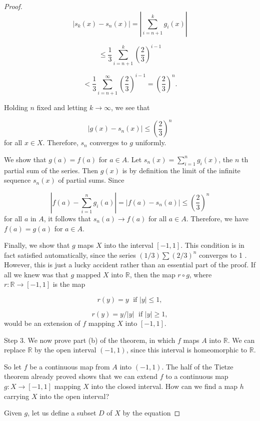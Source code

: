 \begin{proof}
\[
| {s_{k}(x) - s_{n}(x) }| = | {\mathop{\sum }\limits_{{i = n + 1}}^{k}g_{i}(x) }|
\]

\[
\leq \frac{1}{3}\mathop{\sum }\limits_{{i = n + 1}}^{k}{( \frac{2}{3}) }^{i - 1}
\]

\[
< \frac{1}{3}\mathop{\sum }\limits_{{i = n + 1}}^{\infty }{( \frac{2}{3}) }^{i - 1} = {( \frac{2}{3}) }^{n}.
\]

Holding \(n\) fixed and letting \(k \rightarrow \infty\), we see that

\[
| {g(x) - s_{n}(x) }| \leq {( \frac{2}{3}) }^{n}
\]
for all \(x \in X\). Therefore, \(s_{n}\) converges to \(g\) uniformly.

We show that \(g( a) = f( a)\) for \(a \in A\). Let \(s_{n}(x) = \mathop{\sum }\limits_{{i = 1}}^{n}g_{i}(x)\), the \(n\) th partial sum of the series. Then \(g(x)\) is by definition the limit of the infinite sequence \(s_{n}(x)\) of partial sums. Since

\[
| {f( a) - \mathop{\sum }\limits_{{i = 1}}^{n}g_{i}( a) }| = | {f( a) - s_{n}( a) }| \leq {( \frac{2}{3}) }^{n}
\]
for all \(a\) in \(A\), it follows that \(s_{n}( a) \rightarrow f( a)\) for all \(a \in A\). Therefore, we have \(f( a) = g( a)\) for \(a \in A\).

Finally, we show that \(g\) maps \(X\) into the interval \([ {-1,1}]\). This condition is in fact satisfied automatically, since the series \(( {1/3}) \sum {( 2/3) }^{n}\) converges to 1 . However, this is just a lucky accident rather than an essential part of the proof. If all we knew was that \(g\) mapped \(X\) into \(\mathbb{R}\), then the map \(r \circ g\), where \(r : \mathbb{R} \rightarrow [ {-1,1}]\) is the map

\[
r( y) = y\;\text{ if }| y| \leq 1,
\]

\[
r( y) = y/| y| \;\text{ if }| y| \geq 1,
\]
would be an extension of \(f\) mapping \(X\) into \([ {-1,1}]\).

Step 3. We now prove part (b) of the theorem, in which \(f\) maps \(A\) into \(\mathbb{R}\). We can replace \(\mathbb{R}\) by the open interval \((-1,1)\), since this interval is homeomorphic to \(\mathbb{R}\).

So let \(f\) be a continuous map from \(A\) into \((-1,1)\). The half of the Tietze theorem already proved shows that we can extend \(f\) to a continuous map \(g : X \rightarrow [ {-1,1}]\) mapping \(X\) into the closed interval. How can we find a map \(h\) carrying \(X\) into the open interval?

Given \(g\), let us define a subset \(D\) of \(X\) by the equation


\end{proof}
